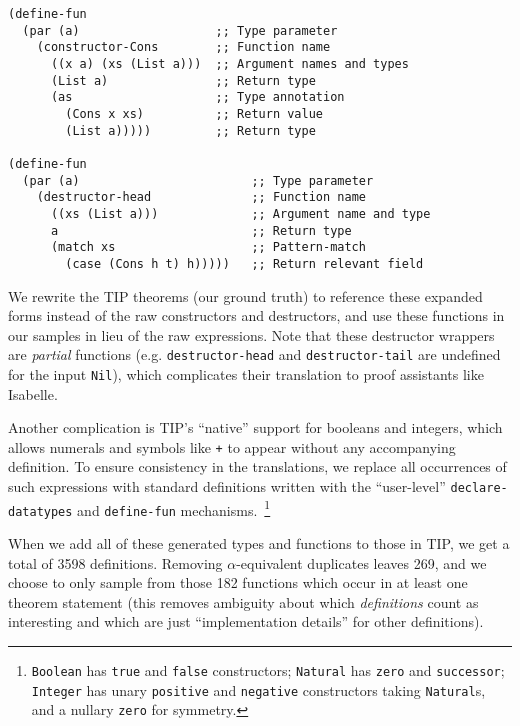 \begin{samepage}
\begin{verbatim}
(define-fun
  (par (a)                   ;; Type parameter
    (constructor-Cons        ;; Function name
      ((x a) (xs (List a)))  ;; Argument names and types
      (List a)               ;; Return type
      (as                    ;; Type annotation
        (Cons x xs)          ;; Return value
        (List a)))))         ;; Return type

(define-fun
  (par (a)                        ;; Type parameter
    (destructor-head              ;; Function name
      ((xs (List a)))             ;; Argument name and type
      a                           ;; Return type
      (match xs                   ;; Pattern-match
        (case (Cons h t) h)))))   ;; Return relevant field
\end{verbatim}
\end{samepage}

\begin{sloppypar}
  We rewrite the TIP theorems (our ground truth) to reference these expanded
  forms instead of the raw constructors and destructors, and use these functions
  in our samples in lieu of the raw expressions. Note that these destructor
  wrappers are \emph{partial} functions (e.g. \texttt{destructor-head} and
  \texttt{destructor-tail} are undefined for the input \texttt{Nil}), which
  complicates their translation to proof assistants like Isabelle.
\end{sloppypar}

Another complication is TIP's ``native'' support for booleans and integers,
which allows numerals and symbols like \texttt{+} to appear without any
accompanying definition. To ensure consistency in the translations, we replace
all occurrences of such expressions with standard definitions written with the
``user-level'' \texttt{declare-datatypes} and \texttt{define-fun}
mechanisms.~\footnote{\texttt{Boolean} has \texttt{true} and \texttt{false}
  constructors; \texttt{Natural} has \texttt{zero} and \texttt{successor};
  \texttt{Integer} has unary \texttt{positive} and \texttt{negative}
  constructors taking \texttt{Natural}s, and a nullary \texttt{zero} for
  symmetry.}

When we add all of these generated types and functions to those in TIP, we get a
total of 3598 definitions. Removing $\alpha$-equivalent duplicates leaves 269,
and we choose to only sample from those 182 functions which occur in at least
one theorem statement (this removes ambiguity about which \emph{definitions}
count as interesting and which are just ``implementation details'' for other
definitions).

